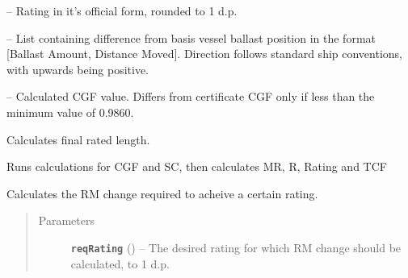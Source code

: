 \documentclass[letterpaper,10pt,english]{sphinxmanual}
\begin{document}
\begin{fulllineitems}

\begin{fulllineitems}
\label{index:IORAnalysis.IOR.Rating}
 -- Rating in it's official form, rounded to 1 d.p.

\end{fulllineitems}


\begin{fulllineitems}
\label{index:IORAnalysis.IOR.ballastChange}
 -- List containing difference from basis vessel ballast
position in the format {[}Ballast Amount, Distance  Moved{]}.
Direction follows standard ship conventions, with
upwards being positive.

\end{fulllineitems}


\begin{fulllineitems}
\label{index:IORAnalysis.IOR.actualCGF}
 -- Calculated CGF value. Differs from certificate CGF only if
less than the minimum value of 0.9860.

\end{fulllineitems}


\begin{fulllineitems}
\label{index:IORAnalysis.IOR.Calc}
Calculates final rated length.

Runs calculations for CGF and SC, then calculates
MR, R, Rating and TCF

\end{fulllineitems}


\begin{fulllineitems}
\label{index:IORAnalysis.IOR.ReqRMChange}
Calculates the RM change required to acheive a certain rating.
\begin{quote}\begin{description}
\item[{Parameters}] \leavevmode
\textbf{\texttt{reqRating}} () -- The desired rating for which RM change should be calculated, to 1 d.p.


\end{description}
\end{quote}
\end{fulllineitems}
\end{fulllineitems}
\end{document}
